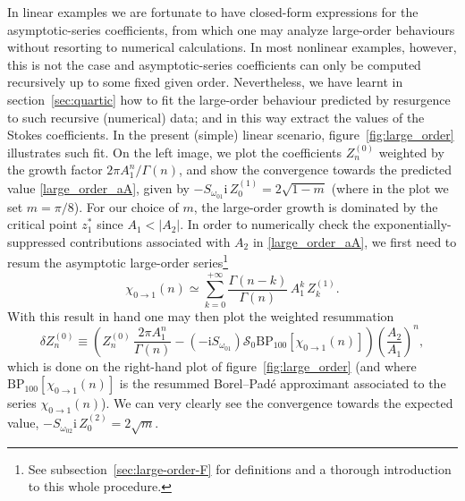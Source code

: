 \documentclass[11pt,a4paper]{article}
\newcommand{\be}{\begin{equation}}
\newcommand{\ee}{\end{equation}}
\begin{document}
In linear examples we are fortunate to have closed-form expressions for the asymptotic-series coefficients, from which one may analyze large-order behaviours without resorting to numerical calculations. In most nonlinear examples, however, this is not the case and asymptotic-series coefficients can only be computed recursively up to some fixed given order. Nevertheless, we have learnt in section~\ref{sec:quartic} how to fit the large-order behaviour predicted by resurgence to such recursive (numerical) data; and in this way extract the values of the Stokes coefficients. In the present (simple) linear scenario, figure~\ref{fig:large_order} illustrates such fit. On the left image, we plot the coefficients $Z^{(0)}_n$ weighted by the growth factor $2\pi A_1^n/\Gamma\left(n\right)$, and show the convergence towards the predicted value  \eqref{large_order_aA}, given by $-S_{\omega_{01}} \mathrm{i}\, Z^{(1)}_0 = 2\sqrt{1-m}$ (where in the plot we set $m=\pi/8$). For our choice of $m$, the large-order growth is dominated by the critical point $z^*_1$ since $A_1<|A_2|$. In order to numerically check the exponentially-suppressed contributions associated with $A_2$ in \eqref{large_order_aA}, we first need to resum the asymptotic large-order series\footnote{See subsection~\ref{sec:large-order-F} for definitions and a thorough introduction to this whole procedure.}
%
\be
\chi_{0\rightarrow1}(n) \simeq \sum_{k=0}^{+\infty} \frac{\Gamma\left(n-k\right)}{\Gamma\left(n\right)}\, A_1^k\, Z^{(1)}_k.
\ee
%
\noindent
With this result in hand one may then plot the weighted resummation
%
\be
\label{ell-partfunc-resummed}
\delta Z^{(0)}_n \equiv \left( Z^{(0)}_n\, \frac{2\pi A_1^n}{\Gamma\left(n\right)} - \left( -\mathrm{i} S_{\omega_{01}} \right) \mathcal{S}_0 \mathrm{BP}_{100} \left[\chi_{0\rightarrow1}(n)\right] \right) \left( \frac{A_2}{A_1} \right)^n,
\ee
%
\noindent
which is done on the right-hand plot of figure~\ref{fig:large_order} (and where $\mathrm{BP}_{100} \left[\chi_{0\rightarrow1}(n)\right]$ is the resummed Borel--Pad\'{e} approximant associated to the series $\chi_{0\rightarrow1}(n)$). We can very clearly see the convergence towards the expected value, $-S_{\omega_{02}} \mathrm{i}\, Z^{(2)}_0 = 2\sqrt{m}$.
\end{document}
